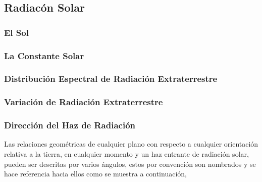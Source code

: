 \subsection{Radiacón Solar}

\subsubsection{El Sol}

\subsubsection{La Constante Solar}

\subsubsection{Distribución Espectral de Radiación Extraterrestre}

\subsubsection{Variación de Radiación Extraterrestre}

\subsubsection{Dirección del Haz de Radiación}

Las relaciones geométricas de cualquier plano con respecto a cualquier orientación relativa a la tierra, en cualquier momento y un haz entrante de radiación solar, pueden ser descritas por varios ángulos, estos por convención son nombrados y se hace referencia hacia ellos como se muestra a continuación,

